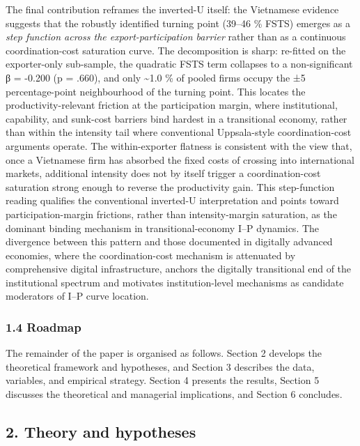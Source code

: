 \documentclass[12pt,a4paper]{article}
\begin{document}
The final contribution reframes the inverted-U itself: the Vietnamese
evidence suggests that the robustly identified turning point (39--46 \%
FSTS) emerges as a \emph{step function across the export-participation
barrier} rather than as a continuous coordination-cost saturation curve.
The decomposition is sharp: re-fitted on the exporter-only sub-sample,
the quadratic FSTS term collapses to a non-significant β = -0.200 (p =
.660), and only \textasciitilde1.0 \% of pooled firms occupy the ±5
percentage-point neighbourhood of the turning point. This locates the
productivity-relevant friction at the participation margin, where
institutional, capability, and sunk-cost barriers bind hardest in a
transitional economy, rather than within the intensity tail where
conventional Uppsala-style coordination-cost arguments operate. The
within-exporter flatness is consistent with the view that, once a
Vietnamese firm has absorbed the fixed costs of crossing into
international markets, additional intensity does not by itself trigger a
coordination-cost saturation strong enough to reverse the productivity
gain. This step-function reading qualifies the conventional inverted-U
interpretation and points toward participation-margin frictions, rather
than intensity-margin saturation, as the dominant binding mechanism in
transitional-economy I--P dynamics. The divergence between this pattern
and those documented in digitally advanced economies, where the
coordination-cost mechanism is attenuated by comprehensive digital
infrastructure, anchors the digitally transitional end of the
institutional spectrum and motivates institution-level mechanisms as
candidate moderators of I--P curve location.

\hypertarget{14-roadmap}{%
\subsubsection{1.4 Roadmap}\label{14-roadmap}}

The remainder of the paper is organised as follows. Section 2 develops
the theoretical framework and hypotheses, and Section 3 describes the
data, variables, and empirical strategy. Section 4 presents the results,
Section 5 discusses the theoretical and managerial implications, and
Section 6 concludes.

\hypertarget{2-theory-and-hypotheses}{%
\subsection{2. Theory and hypotheses}\label{2-theory-and-hypotheses}}
\end{document}
